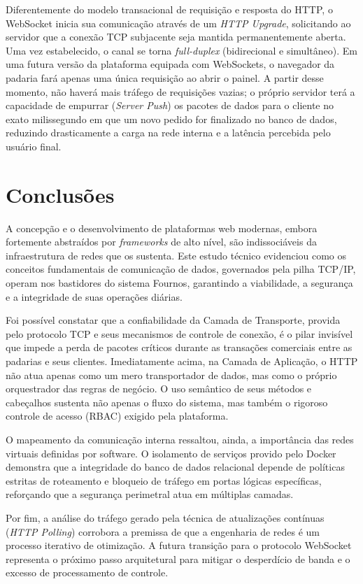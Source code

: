 \documentclass[12pt, a4paper]{article}
\begin{document}
Diferentemente do modelo transacional de requisição e resposta do HTTP, o WebSocket inicia sua comunicação através de um \textit{HTTP Upgrade}, solicitando ao servidor que a conexão TCP subjacente seja mantida permanentemente aberta. Uma vez estabelecido, o canal se torna \textit{full-duplex} (bidirecional e simultâneo). Em uma futura versão da plataforma equipada com WebSockets, o navegador da padaria fará apenas uma única requisição ao abrir o painel. A partir desse momento, não haverá mais tráfego de requisições vazias; o próprio servidor terá a capacidade de empurrar (\textit{Server Push}) os pacotes de dados para o cliente no exato milissegundo em que um novo pedido for finalizado no banco de dados, reduzindo drasticamente a carga na rede interna e a latência percebida pelo usuário final.

\section{Conclusões}

A concepção e o desenvolvimento de plataformas web modernas, embora fortemente abstraídos por \textit{frameworks} de alto nível, são indissociáveis da infraestrutura de redes que os sustenta. Este estudo técnico evidenciou como os conceitos fundamentais de comunicação de dados, governados pela pilha TCP/IP, operam nos bastidores do sistema Fournos, garantindo a viabilidade, a segurança e a integridade de suas operações diárias.

Foi possível constatar que a confiabilidade da Camada de Transporte, provida pelo protocolo TCP e seus mecanismos de controle de conexão, é o pilar invisível que impede a perda de pacotes críticos durante as transações comerciais entre as padarias e seus clientes. Imediatamente acima, na Camada de Aplicação, o HTTP não atua apenas como um mero transportador de dados, mas como o próprio orquestrador das regras de negócio. O uso semântico de seus métodos e cabeçalhos sustenta não apenas o fluxo do sistema, mas também o rigoroso controle de acesso (RBAC) exigido pela plataforma. 

O mapeamento da comunicação interna ressaltou, ainda, a importância das redes virtuais definidas por software. O isolamento de serviços provido pelo Docker demonstra que a integridade do banco de dados relacional depende de políticas estritas de roteamento e bloqueio de tráfego em portas lógicas específicas, reforçando que a segurança perimetral atua em múltiplas camadas.

Por fim, a análise do tráfego gerado pela técnica de atualizações contínuas (\textit{HTTP Polling}) corrobora a premissa de que a engenharia de redes é um processo iterativo de otimização. A futura transição para o protocolo WebSocket representa o próximo passo arquitetural para mitigar o desperdício de banda e o excesso de processamento de controle. 
\end{document}
